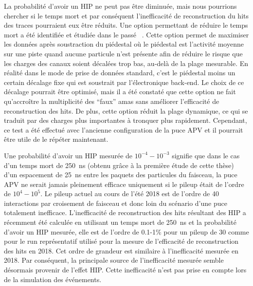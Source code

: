 La probabilité d'avoir un HIP ne peut pas être diminuée, mais nous pourrions chercher si le temps mort et par conséquent l’inefficacité de reconstruction du hits des traces pourraient eux être réduits. Une option permettant de réduire le temps mort a été identifiée et étudiée dans le passé ~\cite{website:hitLoss}. Cette option permet de maximiser les données après soustraction du piédestal où le piédestal est l’activité moyenne sur une piste quand aucune particule n’est présente afin de réduire le risque que les charges des canaux soient décalées trop bas, au-delà de la plage mesurable. En réalité dans le mode de prise de données standard, c'est le piédestal moins un certain décalage fixe qui est soustrait par l’électronique back-end. Le choix de ce décalage pourrait être optimisé, mais il a été constaté que cette option ne fait qu’accroître la multiplicité des ``faux'' amas  sans améliorer l’efficacité de reconstruction des hits. De plus, cette option réduit la plage dynamique, ce qui se traduit par des charges plus importantes à tronquer plus rapidement. Cependant, ce test a été effectué avec l'ancienne configuration de la puce APV et il pourrait être utile de le répéter maintenant.



Une probabilité d'avoir un HIP mesurée de $10^{-4}-10^{-3}$ signifie que dans le cas d'un temps mort de 250~ns (obtenu grâce à la première étude de cette thèse) d'un espacement de 25~ns entre les paquets des particules du faisceau, la puce APV ne serait jamais pleinement efficace uniquement si le pileup était de l'ordre de $10^4 - 10^5$. Le pileup actuel au cours de l'été 2018 est de l'ordre de 40 interactions par croisement de faisceau et donc loin du scénario d'une puce totalement inefficace. L'inefficacité de reconstruction des hits résultant des HIP a récemment été calculée en utilisant un temps mort de 250~ns et la probabilité d'avoir un HIP mesurée, elle est de l'ordre de 0.1-1\% pour un pileup de 30 comme pour le run représentatif utilisé pour la mesure de l'efficacité de reconstruction des hits en 2018. Cet ordre de grandeur est similaire à l'inefficacité mesurée en 2018. Par conséquent, la principale source de l’inefficacité mesurée semble désormais provenir de l’effet HIP. Cette inefficacité n'est pas prise en compte lors de la simulation des événements.



